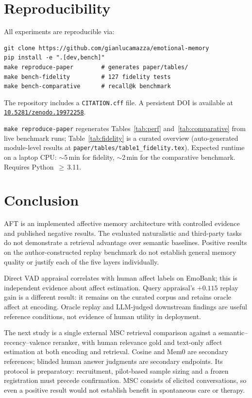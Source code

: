 \documentclass[11pt]{article}
\newcommand{\zenodoconceptdoi}{10.5281/zenodo.19972258}%
\newcommand{\zenodoconcepturl}{https://doi.org/\zenodoconceptdoi}
\begin{document}
\section{Reproducibility}
\label{sec:reproducibility}

All experiments are reproducible via:
\begin{lstlisting}
git clone https://github.com/gianlucamazza/emotional-memory
pip install -e ".[dev,bench]"
make reproduce-paper        # generates paper/tables/
make bench-fidelity         # 127 fidelity tests
make bench-comparative      # recall@k benchmark
\end{lstlisting}

\begin{sloppypar}
The repository includes a \texttt{CITATION.cff} file.
A persistent DOI is available at \href{\zenodoconcepturl}{\texttt{\zenodoconceptdoi}}.
\end{sloppypar}
\texttt{make reproduce-paper} regenerates Tables~\ref{tab:perf} and~\ref{tab:comparative}
from live benchmark runs; Table~\ref{tab:fidelity} is a curated overview
(auto-generated module-level results at \texttt{paper/tables/table1\_fidelity.tex}).
Expected runtime on a laptop CPU: ${\sim}$5\,min for fidelity, ${\sim}$2\,min for
the comparative benchmark. Requires Python~$\geq$\,3.11.

\section{Conclusion}
AFT is an implemented affective memory architecture with controlled evidence and
published negative results. The evaluated naturalistic and third-party tasks do
not demonstrate a retrieval advantage over semantic baselines. Positive results
on the author-constructed replay benchmark do not establish general memory
quality or justify each of the five layers individually.

Direct VAD appraisal correlates with human affect labels on EmoBank; this is
independent evidence about affect estimation. Query appraisal's $+0.115$ replay
gain is a different result: it remains on the curated corpus and retains oracle
affect at encoding. Oracle replay and LLM-judged downstream findings are useful
reference conditions, not evidence of human utility in deployment.

The next study is a single external MSC retrieval comparison against a
semantic--recency--valence reranker, with human relevance gold and text-only
affect estimation at both encoding and retrieval. Cosine and Mem0 are secondary
references; blinded human answer judgments are secondary endpoints. Its protocol
is preparatory: recruitment, pilot-based sample sizing and a frozen registration
must precede confirmation. MSC consists of elicited conversations, so even a
positive result would not establish benefit in spontaneous care or therapy.
\end{document}
